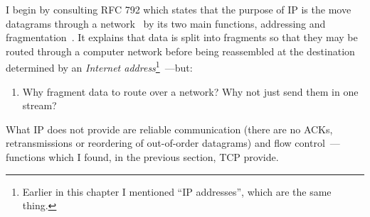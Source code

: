 \documentclass[11pt,a4paper]{report}
\newcommand{\Q}[2]{
	\label{#2}
	\marginpar{\textbf{Q#1.\begin{NoHyper}\ref{#2}\end{NoHyper} }}
}
\newcounter{saveenumi}
\newcommand{\savei}{\setcounter{saveenumi}{\value{enumi}}}
\begin{document}
	I begin by consulting RFC 792 which states that the purpose of IP is the move datagrams through a network~\cite[Section 2.3]{ip} by its two main functions, addressing and fragmentation~\cite[Section 1.4]{ip}. It explains that data is split into fragments so that they may be routed through a computer network before being reassembled at the destination determined by an \textit{Internet address}\footnote{Earlier in this chapter I mentioned ``IP addresses'', which are the same thing.}~\cite[Section 2.3]{ip}---but:
	\begin{enumerate}
		\item Why fragment data to route over a network? Why not just send them in one stream? \Q{4}{enum:fragment}
		\savei
	\end{enumerate}
	What IP does not provide are reliable communication (there are no ACKs, retransmissions or reordering of out-of-order datagrams) and flow control~\cite[Section 1.4]{ip}---functions which I found, in the previous section, TCP provide.
	
\end{document}
